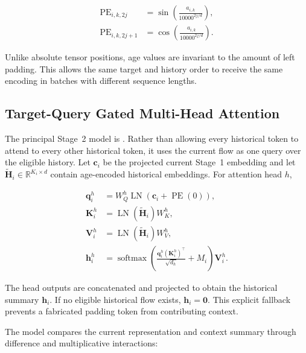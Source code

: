 \documentclass[11pt,fleqn]{report}
\begin{document}
\begin{align}
    \operatorname{PE}_{i,k,2j}
    &=\sin\left(
        \frac{a_{i,k}}{10000^{2j/d}}
      \right),\\
    \operatorname{PE}_{i,k,2j+1}
    &=\cos\left(
        \frac{a_{i,k}}{10000^{2j/d}}
      \right).
    \label{eq:stage2_age_encoding}
\end{align}

Unlike absolute tensor positions, age values are invariant to the amount of
left padding. This allows the same target and history order to receive the same
encoding in batches with different sequence lengths.

\subsection{Target-Query Gated Multi-Head Attention}
\label{subsubsec:target_query_attention}

The principal Stage~2 model is
. Rather than allowing every historical token
to attend to every other historical token, it uses the current flow as one
query over the eligible history. Let $\mathbf{c}_i$ be the projected current
Stage~1 embedding and let
$\widetilde{\mathbf{H}}_i\in\mathbb{R}^{K_i\times d}$ contain age-encoded
historical embeddings. For attention head $h$,

\begin{align}
    \mathbf{q}^{h}_i
    &=W_Q^{h}\operatorname{LN}
      \left(\mathbf{c}_i+\operatorname{PE}(0)\right),\\
    \mathbf{K}^{h}_i
    &=\operatorname{LN}(\widetilde{\mathbf{H}}_i)W_K^{h},\\
    \mathbf{V}^{h}_i
    &=\operatorname{LN}(\widetilde{\mathbf{H}}_i)W_V^{h},\\
    \mathbf{h}^{h}_i
    &=\operatorname{softmax}
      \left(
        \frac{\mathbf{q}^{h}_i(\mathbf{K}^{h}_i)^{\top}}
             {\sqrt{d_h}}+M_i
      \right)
      \mathbf{V}^{h}_i.
    \label{eq:target_query_attention}
\end{align}

The head outputs are concatenated and projected to obtain the historical
summary $\mathbf{h}_i$. If no eligible historical flow exists,
$\mathbf{h}_i=\mathbf{0}$. This explicit fallback prevents a fabricated
padding token from contributing context.

The model compares the current representation and context summary through
difference and multiplicative interactions:
\end{document}
